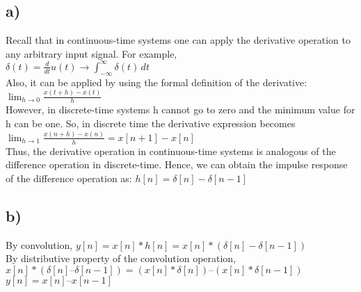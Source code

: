 \documentclass[12pt]{article}
\begin{document}
    \subsection*{a)}
    Recall that in continuous-time systems one can apply the derivative
    operation to any arbitrary input signal. For example,\\
    \begin{math}
      \delta(t) = \frac{d}{dt}u(t)\longrightarrow \int_{-\infty }^{\infty }  \delta(t)\,dt 
    \end{math}\\
    Also, it can be applied by using the formal definition of the derivative:\\
    \begin{math}
      \lim_{h \to 0} \frac{x(t+h)-x(t)}{h} 
    \end{math}\\
    However, in discrete-time systems h cannot go to zero and the minimum
    value for h can be one. So, in discrete time the derivative expression becomes\\
    \begin{math}
      \lim_{h \to 1} \frac{x(n+h)-x(n)}{h} = x[n+1]-x[n] 
    \end{math}\\
    Thus, the derivative operation in continuous-time systems is analogous of
    the difference operation in discrete-time. Hence, we can obtain the impulse
    response of the difference operation as: \(h[n] = \delta[n] - \delta[n-1]\)
    \subsection*{b)}
    By convolution, \(y[n] = x[n]*h[n] = x[n]*(\delta[n]-\delta[n-1])\)\\
    By distributive property of the convolution operation,\\ 
    \(x[n]*( \delta[n] – \delta[n-1]) = (x[n]* \delta[n]) – (x[n]* \delta[n-1])\)\\
    \(y[n] = x[n] – x[n-1]\)
\end{document}
